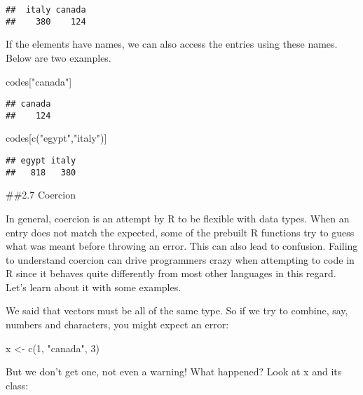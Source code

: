 \documentclass[
]{article}
\newenvironment{Shaded}{\begin{snugshade}}{\end{snugshade}}
\newcommand{\DecValTok}[1]{\textcolor[rgb]{0.00,0.00,0.81}{#1}}
\newcommand{\FunctionTok}[1]{\textcolor[rgb]{0.00,0.00,0.00}{#1}}
\newcommand{\NormalTok}[1]{#1}
\newcommand{\OtherTok}[1]{\textcolor[rgb]{0.56,0.35,0.01}{#1}}
\newcommand{\StringTok}[1]{\textcolor[rgb]{0.31,0.60,0.02}{#1}}
\begin{document}
\begin{verbatim}
##  italy canada 
##    380    124
\end{verbatim}

If the elements have names, we can also access the entries using these
names. Below are two examples.

\begin{Shaded}
\begin{Highlighting}[]
\NormalTok{codes[}\StringTok{"canada"}\NormalTok{]}
\end{Highlighting}
\end{Shaded}

\begin{verbatim}
## canada 
##    124
\end{verbatim}

\begin{Shaded}
\begin{Highlighting}[]
\NormalTok{codes[}\FunctionTok{c}\NormalTok{(}\StringTok{"egypt"}\NormalTok{,}\StringTok{"italy"}\NormalTok{)]}
\end{Highlighting}
\end{Shaded}

\begin{verbatim}
## egypt italy 
##   818   380
\end{verbatim}

\#\#2.7 Coercion

In general, coercion is an attempt by R to be flexible with data types.
When an entry does not match the expected, some of the prebuilt R
functions try to guess what was meant before throwing an error. This can
also lead to confusion. Failing to understand coercion can drive
programmers crazy when attempting to code in R since it behaves quite
differently from most other languages in this regard. Let's learn about
it with some examples.

We said that vectors must be all of the same type. So if we try to
combine, say, numbers and characters, you might expect an error:

\begin{Shaded}
\begin{Highlighting}[]
\NormalTok{x }\OtherTok{\textless{}{-}} \FunctionTok{c}\NormalTok{(}\DecValTok{1}\NormalTok{, }\StringTok{"canada"}\NormalTok{, }\DecValTok{3}\NormalTok{)}
\end{Highlighting}
\end{Shaded}

But we don't get one, not even a warning! What happened? Look at x and
its class:
\end{document}
